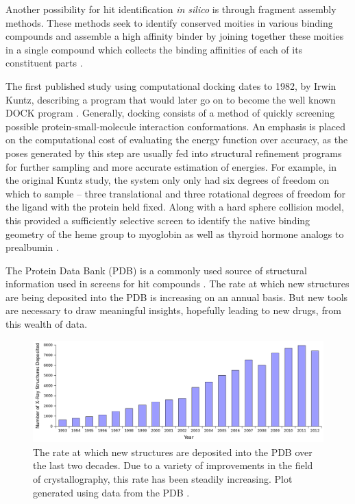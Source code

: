Another possibility for hit identification {\it in silico} is through fragment assembly methods.
These methods seek to identify conserved moities in various binding compounds and assemble a high affinity binder by joining together these moities in a single compound which collects the binding affinities of each of its constituent parts \cite{jorgensen2006computer,jorgensen2004many,jorgensen2009efficient}.

The first published study using computational docking dates to 1982, by Irwin Kuntz, describing a program that would later go on to become the well known DOCK program \cite{kuntz1982geometric}.
Generally, docking consists of a method of quickly screening possible protein-small-molecule interaction conformations.
An emphasis is placed on the computational cost of evaluating the energy function over accuracy, as the poses generated by this step are usually fed into structural refinement programs for further sampling and more accurate estimation of energies.
For example, in the original Kuntz study, the system only only had six degrees of freedom on which to sample -- three translational and three rotational degrees of freedom for the ligand with the protein held fixed.
Along with a hard sphere collision model, this provided a sufficiently selective screen to identify the native binding geometry of the heme group to myoglobin as well as thyroid hormone analogs to prealbumin \cite{kuntz1982geometric}.

The Protein Data Bank (PDB) is a commonly used source of structural information used in screens for hit compounds \cite{abola1984protein}. 
The rate at which new structures are being deposited into the PDB is increasing on an annual basis.
But new tools are necessary to draw meaningful insights, hopefully leading to new drugs, from this wealth of data.
\begin{figure}[H]
\begin{center}
\includegraphics[width=\textwidth]{figures/pdb_deposit_rate.png}
\caption{The rate at which new structures are deposited into the PDB over the last two decades.
Due to a variety of improvements in the field of crystallography, this rate has been steadily increasing.
Plot generated using data from the PDB \protect\cite{berman2003announcing,berman2000protein}.}
\label{figure:pdb_growth}
\end{center}
\end{figure}


